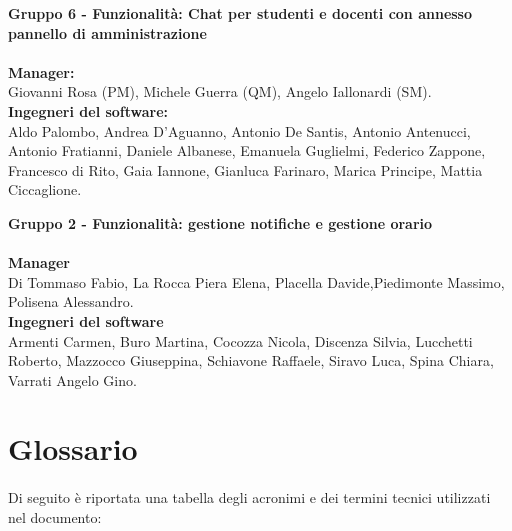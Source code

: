 \textbf{Gruppo 6 - Funzionalità: Chat per studenti e docenti con annesso pannello di amministrazione} \\ \\
\textbf{Manager:} \\
Giovanni Rosa (PM),
Michele Guerra (QM),
Angelo Iallonardi (SM). \\
\textbf{Ingegneri del software:} \\
Aldo Palombo,
Andrea D'Aguanno,
Antonio De Santis,
Antonio Antenucci,
Antonio Fratianni,
Daniele Albanese,
Emanuela Guglielmi,
Federico Zappone,
Francesco di Rito,
Gaia Iannone,
Gianluca Farinaro,
Marica Principe,
Mattia Ciccaglione.

\textbf {Gruppo 2 - Funzionalità: gestione notifiche e gestione orario} \\ \\
\textbf{Manager} \\
Di Tommaso Fabio, La Rocca Piera Elena, Placella Davide,Piedimonte Massimo, Polisena Alessandro. \\
\textbf{Ingegneri del software} \\
Armenti Carmen, Buro Martina, Cocozza Nicola, Discenza Silvia, Lucchetti Roberto, Mazzocco Giuseppina, Schiavone Raffaele, Siravo Luca, Spina Chiara, Varrati Angelo Gino.

\section{Glossario}

\paragraph{}
Di seguito è riportata una tabella degli acronimi e dei termini tecnici utilizzati nel documento:

